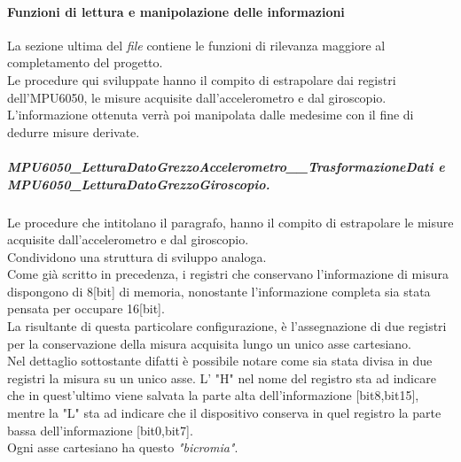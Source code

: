\documentclass[11pt]{report}
\begin{document}
\paragraph{Funzioni di lettura e manipolazione delle informazioni}
La sezione ultima del \textit{file} contiene le funzioni di rilevanza maggiore al completamento del progetto.\\
Le procedure qui sviluppate hanno il compito di estrapolare dai registri dell'MPU6050, le misure acquisite dall'accelerometro e dal giroscopio. L'informazione ottenuta verrà poi manipolata dalle medesime con il fine di dedurre misure derivate.
\subparagraph{MPU6050\_LetturaDatoGrezzoAccelerometro\_\_TrasformazioneDati e\\ MPU6050\_LetturaDatoGrezzoGiroscopio.}
Le procedure che intitolano il paragrafo, hanno il compito di estrapolare le misure acquisite dall'accelerometro e dal giroscopio.\\Condividono una struttura di sviluppo analoga.\\
Come già scritto in precedenza, i registri che conservano l'informazione di misura dispongono di 8[bit] di memoria, nonostante l'informazione completa sia stata pensata per occupare 16[bit].\\
La risultante di questa particolare configurazione, è l'assegnazione di due registri per la conservazione della misura acquisita lungo un unico asse cartesiano.\\
Nel dettaglio sottostante difatti è possibile notare come sia stata divisa in due registri la misura su un unico asse.
L' "H" nel nome del registro sta ad indicare che in quest'ultimo viene salvata la parte alta dell'informazione [bit8,bit15], mentre la "L" sta ad indicare che il dispositivo conserva in quel registro la parte bassa dell'informazione [bit0,bit7].\\
Ogni asse cartesiano ha questo \textit{"bicromia"}.
\begin{table}[H]
    \centering
    \caption{Dettaglio sull'adiacenza dei registri contenenti l'informazione}
    \label{tab: tabella}
\end{table}
\end{document}
